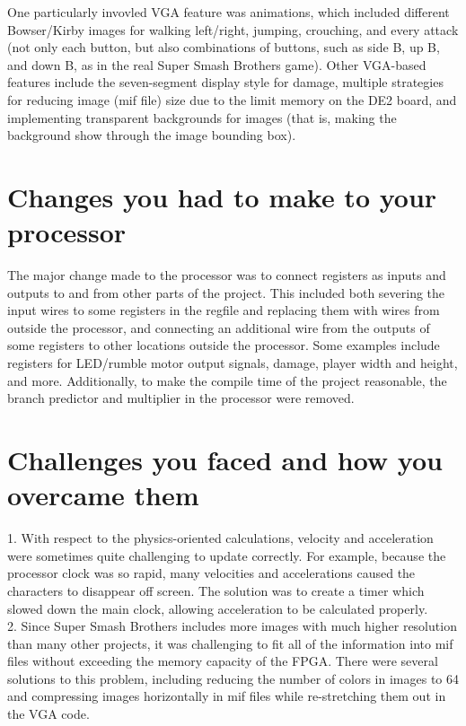 \documentclass[12pt]{article} %
\begin{document}
One particularly invovled VGA feature was animations, which included different Bowser/Kirby images for walking left/right, jumping, crouching, and every attack (not only each button, but also combinations of buttons, such as side B, up B, and down B, as in the real Super Smash Brothers game). Other VGA-based features include the seven-segment display style for damage, multiple strategies for reducing image (mif file) size due to the limit memory on the DE2 board, and implementing transparent backgrounds for images (that is, making the background show through the image bounding box). 

\section{Changes you had to make to your processor}
The major change made to the processor was to connect registers as inputs and outputs to and from other parts of the project. This included both severing the input wires to some registers in the regfile and replacing them with wires from outside the processor, and connecting an additional wire from the outputs of some registers to other locations outside the processor. Some examples include registers for LED/rumble motor output signals, damage, player width and height, and more. Additionally, to make the compile time of the project reasonable, the branch predictor and multiplier in the processor were removed.\\

\section{Challenges you faced and how you overcame them}
1. With respect to the physics-oriented calculations, velocity and acceleration were sometimes quite challenging to update correctly. For example, because the processor clock was so rapid, many velocities and accelerations caused the characters to disappear off screen. The solution was to create a timer which slowed down the main clock, allowing acceleration to be calculated properly.\\

2. Since Super Smash Brothers includes more images with much higher resolution than many other projects, it was challenging to fit all of the information into mif files without exceeding the memory capacity of the FPGA. There were several solutions to this problem, including reducing the number of colors in images to 64 and compressing images horizontally in mif files while re-stretching them out in the VGA code.\\
\end{document}

